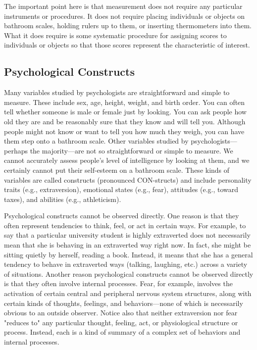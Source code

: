 The important point here is that measurement does not require any particular instruments or procedures. It does not require placing individuals or objects on bathroom scales, holding rulers up to them, or inserting thermometers into them. What it does require is some systematic procedure for assigning scores to individuals or objects so that those scores represent the characteristic of interest.
  


\subsection{Psychological Constructs}


Many variables studied by psychologists are straightforward and simple to measure. These include sex, age, height, weight, and birth order. You can often tell whether someone is male or female just by looking. You can ask people how old they are and be reasonably sure that they know and will tell you. Although people might not know or want to tell you how much they weigh, you can have them step onto a bathroom scale. Other variables studied by psychologists—perhaps the majority—are not so straightforward or simple to measure. We cannot accurately assess people's level of intelligence by looking at them, and we certainly cannot put their self-esteem on a bathroom scale. These kinds of variables are called constructs (pronounced CON-structs) and include personality traits (e.g., extraversion), emotional states (e.g., fear), attitudes (e.g., toward taxes), and abilities (e.g., athleticism).


Psychological constructs cannot be observed directly. One reason is that they often represent tendencies to think, feel, or act in certain ways. For example, to say that a particular university student is highly extraverted does not necessarily mean that she is behaving in an extraverted way right now. In fact, she might be sitting quietly by herself, reading a book. Instead, it means that she has a general tendency to behave in extraverted ways (talking, laughing, etc.) across a variety of situations. Another reason psychological constructs cannot be observed directly is that they often involve internal processes. Fear, for example, involves the activation of certain central and peripheral nervous system structures, along with certain kinds of thoughts, feelings, and behaviors—none of which is necessarily obvious to an outside observer. Notice also that neither extraversion nor fear "reduces to" any particular thought, feeling, act, or physiological structure or process. Instead, each is a kind of summary of a complex set of behaviors and internal processes.


